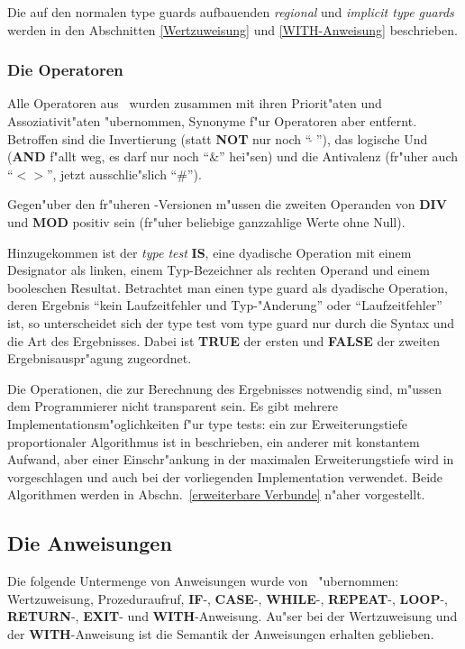 Die auf den normalen type guards aufbauenden {\it regional\/} und {\it implicit type guards\/}
werden in den Abschnitten \ref{Wertzuweisung} und \ref{WITH-Anweisung}
beschrieben.

\subsubsection{Die Operatoren}
\label{Operatoren}

Alle Operatoren aus \modula\ wurden zusammen mit ihren Priorit"aten und
Assoziativit"aten "ubernommen, Synonyme f"ur Operatoren aber entfernt.
Betroffen sind die Invertierung (statt {\bf NOT} nur noch "`$\widetilde{\ }\,$"'), das
logische Und ({\bf AND} f"allt weg, es darf nur noch "`\&"' hei"sen) und die
Antivalenz (fr"uher auch "`$<>$"', jetzt ausschlie"slich "`\#"').

Gegen"uber den fr"uheren \oberon-Versionen m"ussen die zweiten Operanden von
{\bf DIV} und {\bf MOD} positiv sein (fr"uher beliebige ganzzahlige Werte ohne Null).

Hinzugekommen ist der {\it type test\/} {\bf IS}, eine dyadische Operation mit einem
Designator als linken, einem Typ-Bezeichner als rechten Operand und
einem booleschen Resultat.
Betrachtet man einen type guard als dyadische Operation, deren Ergebnis
"`kein Laufzeitfehler und Typ-"Anderung"' oder "`Laufzeitfehler"' ist, so
unterscheidet sich der type test vom type guard nur durch die Syntax und die
Art des Ergebnisses.
Dabei ist {\bf TRUE} der ersten und {\bf FALSE} der zweiten Ergebnisauspr"agung
zugeordnet.

Die Operationen, die zur Berechnung des Ergebnisses notwendig sind, m"ussen
dem Programmierer nicht transparent sein.
Es gibt mehrere Implementationsm"oglichkeiten f"ur type tests: ein zur Erweiterungstiefe
proportionaler Algorithmus ist in \cite{typeExtensions} beschrieben, ein
anderer mit konstantem Aufwand, aber einer Einschr"ankung in der maximalen
Erweiterungstiefe wird in \cite{op2doc} vorgeschlagen und auch
bei der vorliegenden Implementation verwendet.
Beide Algorithmen werden in Abschn.~\ref{erweiterbare Verbunde} n"aher vorgestellt.

\subsection{Die Anweisungen}

Die folgende Untermenge von Anweisungen wurde von \modula\ "ubernommen:
Wertzuweisung, Prozeduraufruf, {\bf IF}-, {\bf CASE}-, {\bf WHILE}-,
{\bf REPEAT}-, {\bf LOOP}-, {\bf RETURN}-, {\bf EXIT}- und {\bf WITH}-Anweisung.
Au"ser bei der Wertzuweisung und der {\bf WITH}-Anweisung ist die Semantik
der Anweisungen erhalten geblieben.


